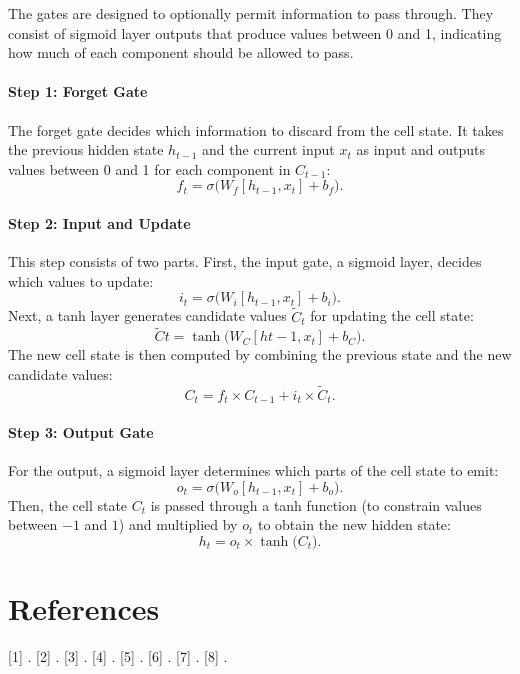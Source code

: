 \documentclass[11pt]{article}
\begin{document}
The gates are designed to optionally permit information to pass through. They consist of sigmoid layer outputs that produce values between 0 and 1, indicating how much of each component should be allowed to pass.
{\small
\paragraph{Step 1: Forget Gate}
The forget gate decides which information to discard from the cell state. It takes the previous hidden state \(h_{t-1}\) and the current input \(x_t\) as input and outputs values between 0 and 1 for each component in \(C_{t-1}\):  
\[
f_t = \sigma\bigl(W_f [h_{t-1}, x_t] + b_f\bigr).
\]
}
{\small

\paragraph{Step 2: Input and Update}  
This step consists of two parts. First, the input gate, a sigmoid layer, decides which values to update:  
\[
i_t = \sigma\bigl(W_i [h_{t-1}, x_t] + b_i\bigr).
\]  
Next, a tanh layer generates candidate values \(\tilde{C}_t\) for updating the cell state:  
\[
\tilde{C}t = \tanh\bigl(W_C [h{t-1}, x_t] + b_C\bigr).
\]  
The new cell state is then computed by combining the previous state and the new candidate values:  
\[
C_t = f_t \times C_{t-1} + i_t \times \tilde{C}_t.
\]  
}
{\small
\paragraph{Step 3: Output Gate}
For the output, a sigmoid layer determines which parts of the cell state to emit:
\[
o_t = \sigma\bigl(W_o [h_{t-1}, x_t] + b_o\bigr).
\]
Then, the cell state \(C_t\) is passed through a tanh function (to constrain values between \(-1\) and \(1\)) and multiplied by \(o_t\) to obtain the new hidden state:
\[
h_t = o_t \times \tanh\bigl(C_t\bigr).
\]
}

\section*{References}


[1] . 
[2] . 
[3] . 
[4] . 
[5] . 
[6] . 
[7] . 
[8] . 
\end{document}
